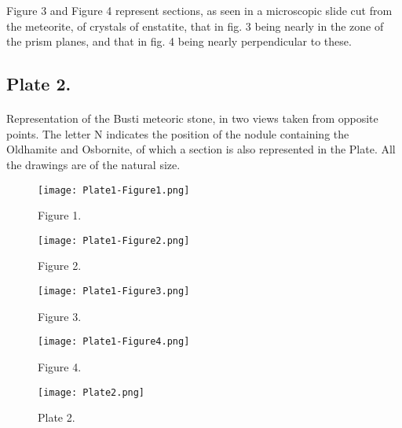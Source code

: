 \documentclass[a4paper, 12pt, oneside]{article}
\begin{document}
Figure 3 and Figure 4 represent sections, as seen in a microscopic slide cut from the meteorite, of crystals of enstatite, that in fig. 3 being nearly in the zone of the prism planes, and that in fig. 4 being nearly perpendicular to these.
\subsection{Plate 2.}
\paragraph{}
Representation of the Busti meteoric stone, in two views taken from opposite points. The letter N indicates the position of the nodule containing the Oldhamite and Osbornite, of which a section is also represented in the Plate. All the drawings are of the natural size.
\clearpage
\pagestyle{fancy}
\fancyhf{}
\cfoot{\thepage}
\begin{figure}[H]
\centering
\texttt{[image: Plate1-Figure1.png]}
\caption{\small Figure 1.}
\end{figure}

\begin{figure}[H]
\centering
\texttt{[image: Plate1-Figure2.png]}
\caption{\small Figure 2.}
\end{figure}

\begin{figure}[H]
\centering
\texttt{[image: Plate1-Figure3.png]}
\caption{\small Figure 3.}
\end{figure}

\begin{figure}[H]
\centering
\texttt{[image: Plate1-Figure4.png]}
\caption{\small Figure 4.}
\end{figure}
\clearpage
{}
\begin{figure}[H]
\centering
\texttt{[image: Plate2.png]}
\caption{\small Plate 2.}
\end{figure}
\end{document}

